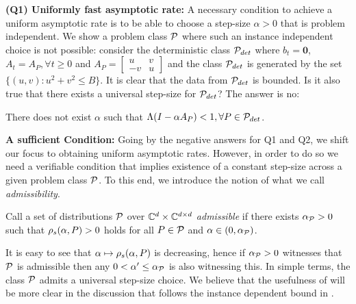 \textbf{(Q1) Uniformly fast asymptotic rate:} A necessary condition to achieve a uniform asymptotic rate is to be able to choose a step-size $\alpha>0$ that is problem independent. 
We show a problem class $\P$ where such an instance independent choice is not possible: consider the deterministic class $\P_{det}$ where $b_t=\mathbf{0}$, $A_t=A_P, \forall t\geq 0$ and $A_P=\left[\begin{matrix} u &v \\ -v & u\end{matrix}\right] $ and the class $\P_{det}$ is generated by the set $\{(u,v) : u^2+v^2\leq B\}$. It is clear that the data from $\P_{det}$ is bounded. Is it also true that there exists a universal step-size for $\P_{det}$? The answer is no:  
\begin{proposition}\label{prop:unistep}
There does not exist $\alpha$ such that $\Lambda(I-\alpha A_P)<1, \forall P\in \P_{det}$. 
\end{proposition}
\textbf{A sufficient Condition:} Going by the negative answers for Q1 and Q2, we shift our focus to obtaining uniform asymptotic rates. However, in order to do so we need a verifiable condition that implies existence of a constant step-size across a given problem class $\P$. To this end, we introduce the notion of what we call \emph{admissibility}.
\begin{definition}\label{def:admis}
Call a set of distributions $\P$ over $\C^{d}\times \C^{\dcd}$
\emph{admissible} if there exists $\alpha_{\P}>0$ such that
$\rhos{P}>0$ holds for all $P\in \P$ and $\alpha\in(0,\alpha_{\P})$.
\end{definition}
It is easy to see that $\alpha \mapsto \rhos{P}$ is decreasing,
hence if $\alpha_{\P}>0$ witnesses that $\P$ is admissible
then any $0<\alpha'\le \alpha_{\P}$ is also witnessing this. In simple terms, the class $\P$ admits a universal step-size choice. We believe that the usefulness of 
 will be more clear in the discussion that follows the instance dependent bound in .


